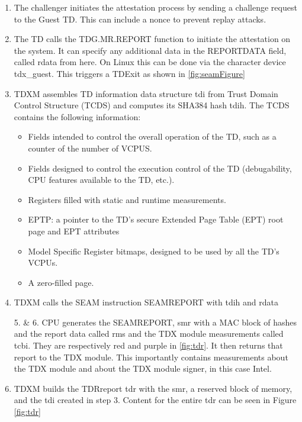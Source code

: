 \begin{enumerate}
\item The challenger initiates the attestation process by sending a challenge request to the Guest TD. This can include a nonce to prevent replay attacks\cite{sardar_formal_2023}.
\item The TD calls the TDG.MR.REPORT function to initiate the attestation on the system. It can specify any additional data in the REPORTDATA field, called rdata from here. On Linux this can be done via the character device tdx\_guest. This triggers a TDExit as shown in \cref{fig:seamFigure}
\item TDXM assembles TD information data structure tdi from Trust Domain Control Structure (TCDS) and computes its SHA384 hash tdih. The TCDS contains the following information:
\begin{itemize}
    \item Fields intended to control the overall operation of the TD, such as a counter of the number of VCPUS. 
    \item Fields designed to control the execution control of the TD (debugability, CPU features available to the TD, etc.). 
    \item Registers filled with static and runtime measurements. 
    \item EPTP: a pointer to the TD’s secure Extended Page Table (EPT) root page and EPT attributes
    \item Model Specific Register bitmaps, designed to be used by all the TD’s VCPUs. 
    \item A zero-filled page.
\end{itemize}
\item TDXM calls the SEAM instruction SEAMREPORT with tdih and rdata
\item[5. \& 6.] CPU generates the SEAMREPORT, smr with a MAC block of hashes and the report data called rms and the TDX module measurements called tcbi. They are respectively red and purple in \cref{fig:tdr}. It then returns that report to the TDX module. This importantly contains measurements about the TDX module and about the TDX module signer, in this case Intel.
\item TDXM builds the TDRreport tdr with the smr, a reserved block of memory, and the tdi created in step 3. Content for the entire tdr can be seen in Figure \ref{fig:tdr}
\begin{figure}
\centering

\end{figure}
\end{enumerate}
